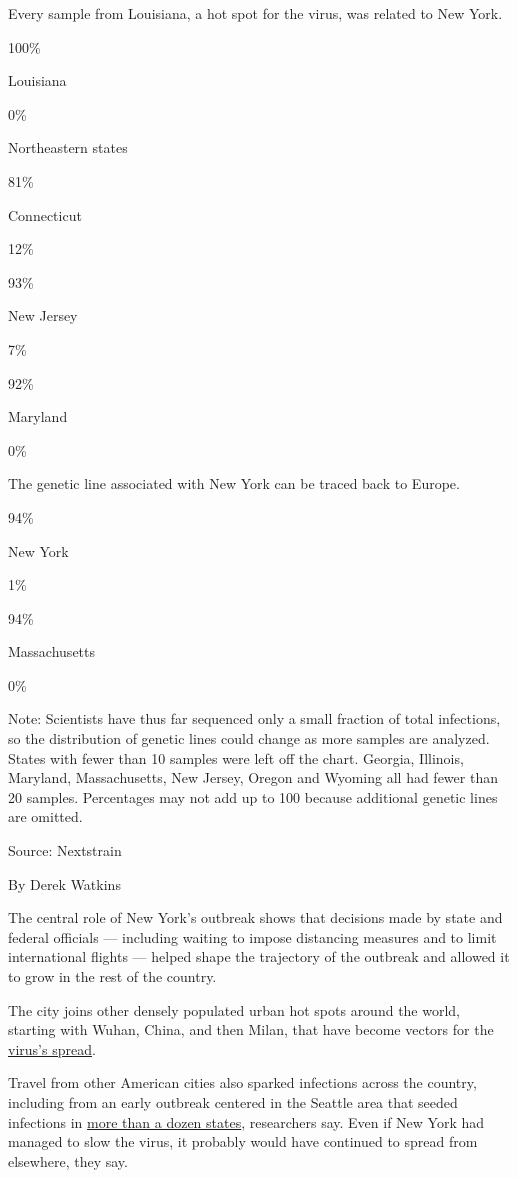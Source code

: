 Every sample from Louisiana, a hot spot for the virus, was related to
New York.

100\%

Louisiana

0\%

Northeastern states

81\%

Connecticut

12\%

93\%

New Jersey

7\%

92\%

Maryland

0\%

The genetic line associated with New York can be traced back to Europe.

94\%

New York

1\%

94\%

Massachusetts

0\%

Note: Scientists have thus far sequenced only a small fraction of total
infections, so the distribution of genetic lines could change as more
samples are analyzed. States with fewer than 10 samples were left off
the chart. Georgia, Illinois, Maryland, Massachusetts, New Jersey,
Oregon and Wyoming all had fewer than 20 samples. Percentages may not
add up to 100 because additional genetic lines are omitted.

Source: Nextstrain

By Derek Watkins

The central role of New York's outbreak shows that decisions made by
state and federal officials --- including waiting to impose distancing
measures and to limit international flights --- helped shape the
trajectory of the outbreak and allowed it to grow in the rest of the
country.

The city joins other densely populated urban hot spots around the world,
starting with Wuhan, China, and then Milan, that have become vectors for
the
\href{https://www.nytimes.com/2020/07/04/health/239-experts-with-one-big-claim-the-coronavirus-is-airborne.html}{virus's
spread}.

Travel from other American cities also sparked infections across the
country, including from an early outbreak centered in the Seattle area
that seeded infections in
\href{https://www.nytimes.com/2020/04/22/us/coronavirus-sequencing.html}{more
than a dozen states}, researchers say. Even if New York had managed to
slow the virus, it probably would have continued to spread from
elsewhere, they say.

